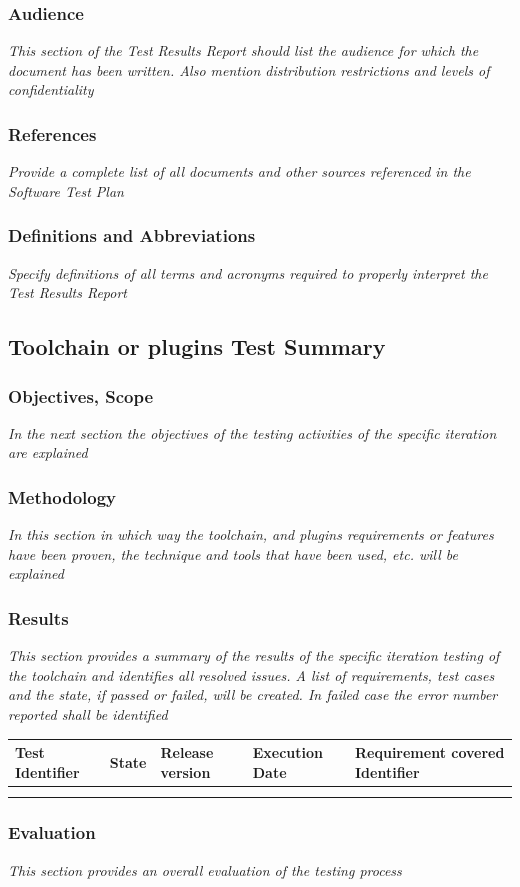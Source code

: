 \begin{appendices}
\subsubsection{Audience}
\textit{This section of the Test Results Report should list the audience for which the document has been written. Also mention distribution restrictions and levels of confidentiality}
\subsubsection{References}
\textit{Provide a complete list of all documents and other sources referenced in the Software Test Plan}
\subsubsection{Definitions and Abbreviations}
\textit{Specify definitions of all terms and acronyms required to properly interpret the Test Results Report}

\subsection{Toolchain or plugins Test Summary}
\subsubsection{Objectives, Scope}
\textit{In the next section the objectives of the testing activities of the specific iteration are explained}
\subsubsection{Methodology}
\textit{In this section in which way the toolchain, and plugins requirements or features have been proven, the technique and tools that have been used, etc. will be explained}
\subsubsection{Results}
\textit{This section provides a summary of the results of the specific iteration testing of the toolchain and identifies all resolved issues. A list of requirements, test cases and the state, if passed or failed, will be created. In failed case the error number reported shall be identified}

\begin{center}
\begin{longtable}{|p{3cm}|p{2cm}|p{3cm}|p{3cm}|p{2cm}|}\hline
Test Identifier & State & Release version & Execution Date & Requirement covered Identifier\\\hline
 & & & & \\\hline
 & & & & \\\hline
\end{longtable}
\end{center}
\subsubsection{Evaluation}
\textit{This section provides an overall evaluation of the testing process}
\end{appendices}